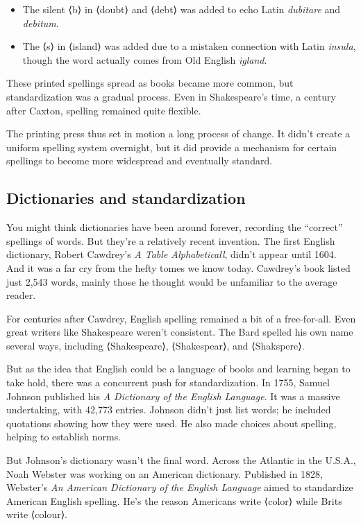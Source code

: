    \begin{itemize}[noitemsep]
     \item The silent ⟨b⟩ in ⟨doubt⟩ and ⟨debt⟩ was added to echo Latin \textit{dubitare} and \textit{debitum}.
     \item The ⟨s⟩ in ⟨island⟩ was added due to a mistaken connection with Latin \textit{insula}, though the word actually comes from Old English \textit{igland}.
   \end{itemize}

These printed spellings spread as books became more common, but standardization was a gradual process. Even in Shakespeare's time, a century after Caxton, spelling remained quite flexible.

The printing press thus set in motion a long process of change. It didn't create a uniform spelling system overnight, but it did provide a mechanism for certain spellings to become more widespread and eventually standard.

\subsection{Dictionaries and standardization}

You might think dictionaries have been around forever, recording the ``correct'' spellings of words. But they're a relatively recent invention. The first English dictionary, Robert Cawdrey's \textit{A Table Alphabeticall}, didn't appear until 1604. And it was a far cry from the hefty tomes we know today. Cawdrey's book listed just 2,543 words, mainly those he thought would be unfamiliar to the average reader.

For centuries after Cawdrey, English spelling remained a bit of a free-for-all. Even great writers like Shakespeare weren't consistent. The Bard spelled his own name several ways, including ⟨Shakespeare⟩, ⟨Shakespear⟩, and ⟨Shakspere⟩.

But as the idea that English could be a language of books and learning began to take hold, there was a concurrent push for standardization. In 1755, Samuel Johnson published his \textit{A Dictionary of the English Language}. It was a massive undertaking, with 42,773 entries. Johnson didn't just list words; he included quotations showing how they were used. He also made choices about spelling, helping to establish norms.

But Johnson's dictionary wasn't the final word. Across the Atlantic in the U.S.A., Noah Webster was working on an American dictionary. Published in 1828, Webster's \textit{An American Dictionary of the English Language} aimed to standardize American English spelling. He's the reason Americans write ⟨color⟩ while Brits write ⟨colour⟩.


